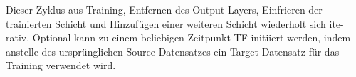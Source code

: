 Dieser Zyklus aus Training, Entfernen des Output-Layers, Einfrieren der trainierten Schicht und Hinzufügen einer weiteren Schicht wiederholt sich 
ite-rativ. Optional kann zu einem beliebigen Zeitpunkt TF initiiert werden, indem
anstelle des ursprünglichen Source-Datensatzes ein Target-Datensatz für das Training verwendet wird.
